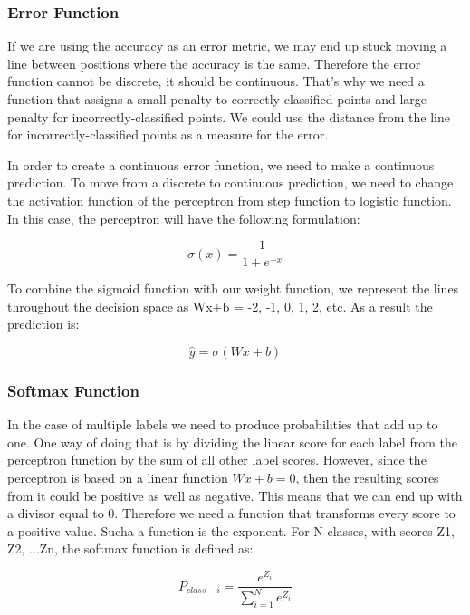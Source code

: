 \documentclass{article}
\begin{document}
\subsubsection{Error Function}
If we are using the accuracy as an error metric, we may end up stuck moving a line between positions where the accuracy is the same. Therefore the error function cannot be discrete, it should be continuous. That’s why we need a function that assigns a small penalty to correctly-classified points and large penalty for incorrectly-classified points. We could use the distance from the line for incorrectly-classified points as a measure for the error.

In order to create a continuous error function, we need to make a continuous prediction. To move from a discrete to continuous prediction, we need to change the activation function of the perceptron from step function to logistic function. In this case, the perceptron will have the following formulation:

\begin{equation}
  \sigma(x) = \frac{1}{1 + e^{-x}}
\end{equation}

To combine the sigmoid function with our weight function, we represent the lines throughout the decision space as Wx+b = -2, -1, 0, 1, 2, etc. As a result the prediction is:

\begin{equation}
  \hat{y} = \sigma(Wx + b)
\end{equation}

\subsubsection{Softmax Function}
In the case of multiple labels we need to produce probabilities that add up to one. One way of doing that is by dividing the linear score for each label from the perceptron function by the sum of all other label scores. However, since the perceptron is based on a linear function $Wx + b = 0$, then the resulting scores from it could be positive as well as negative. This means that we can end up with a divisor equal to 0. Therefore we need a function that transforms every score to a positive value. Sucha a function is the exponent. For N classes, with scores Z1, Z2, ...Zn, the softmax function is defined as:

\begin{equation}
  P_{class-i} = \frac{e^{Z_i}}{\sum_{i = 1}^{N} e^{Z_i}}
\end{equation}
\end{document}

